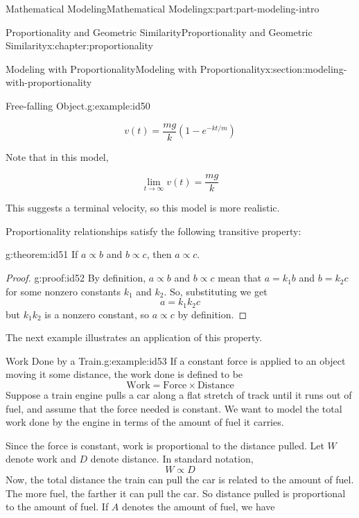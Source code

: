 \documentclass[oneside,10pt,]{book}
\numberwithin{equation}{section}
\begin{document}
\begin{partptx}{Mathematical Modeling}{}{Mathematical Modeling}{}{}{x:part:part-modeling-intro}
\begin{chapterptx}{Proportionality and Geometric Similarity}{}{Proportionality and Geometric Similarity}{}{}{x:chapter:proportionality}
\begin{sectionptx}{Modeling with Proportionality}{}{Modeling with Proportionality}{}{}{x:section:modeling-with-proportionality}
\begin{example}{Free-falling Object.}{g:example:id50}
\par
%
\begin{equation*}
v(t) = \frac{mg}{k}\left(1-e^{-kt/m}\right)
\end{equation*}
%
\par
Note that in this model,%
\par
%
\begin{equation*}
\lim_{t\to\infty} v(t) = \frac{mg}{k}
\end{equation*}
%
\par
This suggests a terminal velocity, so this model is more realistic.%
\end{example}
Proportionality relationships satisfy the following transitive property:%
\begin{theorem}{}{}{g:theorem:id51}%
If \(a\propto b\) and \(b\propto c\), then \(a\propto c\).\end{theorem}
\begin{proof}{}{g:proof:id52}
By definition, \(a\propto b\) and \(b\propto c\) mean that \(a=k_1 b\) and \(b=k_2 c\) for some nonzero constants \(k_1\) and \(k_2\). So, substituting we get%
%
\begin{equation*}
a=k_1k_2c
\end{equation*}
but \(k_1k_2\) is a nonzero constant, so \(a\propto c\) by definition.%
\end{proof}
The next example illustrates an application of this property.%
\begin{example}{Work Done by a Train.}{g:example:id53}%
If a constant force is applied to an object moving it some distance, the work done is defined to be%
%
\begin{equation*}
\text{Work} = \text{Force}\times\text{Distance} 
\end{equation*}
Suppose a train engine pulls a car along a flat stretch of track until it runs out of fuel, and assume that the force needed is constant. We want to model the total work done by the engine in terms of the amount of fuel it carries.%
\par
Since the force is constant, work is proportional to the distance pulled. Let \(W\) denote work and \(D\) denote distance. In standard notation,%
%
\begin{equation*}
W\propto D
\end{equation*}
Now, the total distance the train can pull the car is related to the amount of fuel. The more fuel, the farther it can pull the car. So distance pulled is proportional to the amount of fuel. If \(A\) denotes the amount of fuel, we have%

\end{example}
\end{sectionptx}
\end{chapterptx}
\end{partptx}
\end{document}
